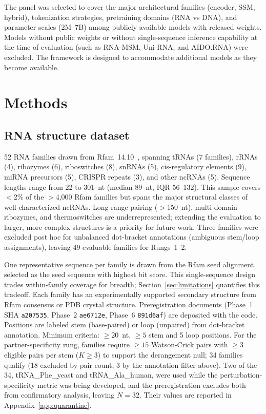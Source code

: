 \documentclass[11pt]{article}
\begin{document}
The panel was selected to cover the major architectural families
(encoder, SSM, hybrid), tokenization strategies, pretraining domains
(RNA vs DNA), and parameter scales (2M--7B) among publicly available
models with released weights. Models without public weights or
without single-sequence inference capability at the time of evaluation
(such as RNA-MSM, Uni-RNA, and AIDO.RNA) were excluded. The framework
is designed to accommodate additional models as they become available.


\section{Methods}

\subsection{RNA structure dataset}

52 RNA families drawn from Rfam~14.10~\citep{rfam2021}, spanning
tRNAs (7 families), rRNAs (4), ribozymes (6), riboswitches (8),
snRNAs (5), cis-regulatory elements (9), miRNA precursors (5),
CRISPR repeats (3), and other ncRNAs (5).
Sequence lengths range from 22 to 301~nt (median 89~nt, IQR 56--132).
This sample covers $<$2\% of the $>$4{,}000 Rfam families but
spans the major structural classes of well-characterized ncRNAs.
Long-range pairing ($>$150~nt), multi-domain ribozymes, and
thermoswitches are underrepresented; extending the evaluation to
larger, more complex structures is a priority for future work.
Three families were excluded post hoc for unbalanced dot-bracket
annotations (ambiguous stem/loop assignments), leaving 49 evaluable
families for Rungs~1--2.

One representative sequence per family is drawn from the Rfam seed
alignment, selected as the seed sequence with highest bit score.
This single-sequence design trades within-family coverage for breadth;
Section~\ref{sec:limitations} quantifies this tradeoff. Each
family has an experimentally supported secondary structure from Rfam
consensus or PDB crystal structure.
Preregistration documents (Phase~1 SHA \texttt{a207535}, Phase~2
\texttt{ae6712e}, Phase~6 \texttt{891d6af}) are deposited with the
code.
Positions are labeled stem
(base-paired) or loop (unpaired) from dot-bracket annotation.
Minimum criteria: $\geq 20$~nt, $\geq 5$ stem and 5 loop
positions. For the
partner-specificity rung, families require $\geq 15$ Watson-Crick
pairs with $\geq 3$ eligible pairs per stem ($K \geq 3$) to support
the derangement null; 34 families qualify (18 excluded by pair count,
3 by the annotation filter above). Two of the 34, tRNA\_Phe\_yeast and
tRNA\_Ala\_human, were used while the perturbation-specificity metric was
being developed, and the preregistration excludes both from confirmatory
analysis, leaving $N = 32$. Their values are reported in
Appendix~\ref{app:quarantine}.
\end{document}
